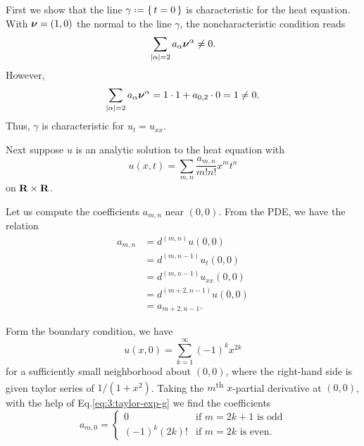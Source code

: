 \begin{solution}
  First we show that the line \(\gamma\defeq\{\,t=0\,\}\) is characteristic
  for the heat equation. With \({\boldsymbol\nu}=(1,0)\) the normal to the line
  \(\gamma\), the noncharacteristic condition reads
  \[
    \sum_{|\alpha|=2} a_\alpha{\boldsymbol\nu}^\alpha\neq 0.
  \]
  However,
  \[
    \sum_{|\alpha|=2} a_\alpha\bfnu^\alpha=%
    1\cdot 1+a_{0,2}\cdot 0=%
    1\neq%
    0.
  \]
  Thus, \(\gamma\) is characteristic for \(u_t=u_{xx}\).

  Next suppose \(u\) is an analytic solution to the heat equation with
  \[
    u(x,t)=\sum_{m,n} \frac{a_{m,n}}{m!n!}x^mt^n
  \]
  on \(\mathbf{R}\times\mathbf{R}\).

  Let us compute the coefficients \(a_{m,n}\) near \((0,0)\). From the PDE,
  we have the relation
  \begin{equation}
    \label{eq:3:pde-relation}
    \begin{aligned}
      a_{m,n}
      &=d^{(m,n)} u(0,0)\\
      &=d^{(m,n-1)}u_t(0,0)\\
      &=d^{(m,n-1)}u_{xx}(0,0)\\
      &=d^{(m+2,n-1)}u(0,0)\\
      &=a_{m+2,n-1}.
    \end{aligned}
  \end{equation}

  Form the boundary condition, we have
  \begin{equation}
    \label{eq:3:taylor-exp-g}
    u(x,0)=\sum_{k=1}^\infty (-1)^k x^{2k}
  \end{equation}
  for a sufficiently small neighborhood about \((0,0)\), where the
  right-hand side is given taylor series of \(1/(1+x^2)\). Taking the
  \(m\)\textsuperscript{th} \(x\)-partial derivative at \((0,0)\), with the
  help of Eq.\@ \eqref{eq:3:taylor-exp-g} we find the coefficients
  \begin{equation}
    \label{eq:3:boundary-relation}
    a_{m,0}=
    \begin{cases}
      0&\text{if \(m=2k+1\) is odd}\\
      (-1)^k(2k)!&\text{if \(m=2k\) is even.}
    \end{cases}
  \end{equation}


\end{solution}
